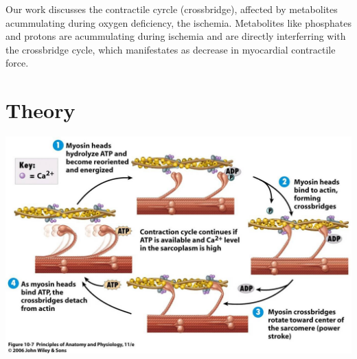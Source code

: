 \documentclass[a0,portrait]{a0poster}
\begin{document}
\begin{multicols}{2}
Our work discusses the contractile cyrcle (crossbridge), affected by
metabolites acummulating during oxygen deficiency, the ischemia.
Metabolites like phosphates and protons are acummulating during ischemia
and are directly interferring with the crossbridge cycle, which
manifestates as decrease in myocardial contractile force.


\color{DarkSlateGray} %

\section*{Theory}

\begin{center}\vspace{0.5cm}
\includegraphics[scale=0.5]{muscle-contraction_hi-res}
\end{center}%


\end{multicols}
\end{document}
